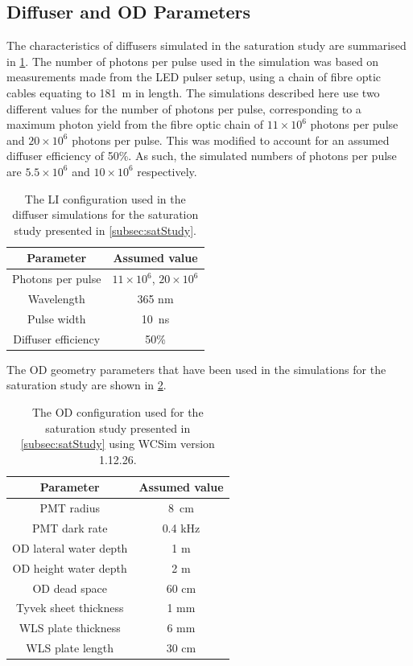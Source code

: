 \documentclass[a4paper,11pt]{article}
\begin{document}
\subsection{Diffuser and OD Parameters}\label{subsec:params}

The characteristics of diffusers simulated in the saturation study are summarised in \cref{tab:satStudyParams}. The number of photons per pulse used in the simulation was based on measurements made from the LED pulser setup, using a chain of fibre optic cables equating to 181~m in length. The simulations described here use two different values for the number of photons per pulse, corresponding to a maximum photon yield from the fibre optic chain of $11\times10^6$ photons per pulse and $20\times10^6$ photons per pulse. This was modified to account for an assumed diffuser efficiency of 50\%. As such, the simulated numbers of photons per pulse are $5.5\times10^6$ and $10\times10^6$ respectively.

\begin{table}[ht!]
    \centering
    \begin{tabular}{|c|c|}
    \hline
        Parameter    & Assumed value \\
        \hline
       Photons per pulse  &  $11\times10^6$, $20\times10^6$\\
       Wavelength  & 365 nm \\
       Pulse width & 10~ns\\
       Diffuser efficiency & 50\%\\
       \hline
    \end{tabular}
    \caption{The LI configuration used in the diffuser simulations for the saturation study presented in \cref{subsec:satStudy}.}
    \label{tab:satStudyParams}
\end{table}

The OD geometry parameters that have been used in the simulations for the saturation study are shown in \cref{tab:od_config}.

\begin{table}[ht!]
    \centering
    \begin{tabular}{|c|c|}
    \hline
        Parameter    & Assumed value \\
        \hline
       PMT radius  &  8~cm\\
       PMT dark rate & 0.4 kHz \\
       OD lateral water depth  & 1 m \\
       OD height water depth & 2 m\\
       OD dead space & 60 cm \\
       Tyvek sheet thickness & 1 mm\\
       WLS plate thickness & 6 mm \\
       WLS plate length & 30 cm \\
       \hline
    \end{tabular}
    \caption{The OD configuration used for the saturation study presented in \cref{subsec:satStudy} using WCSim version 1.12.26.}
    \label{tab:od_config}
\end{table}
\end{document}
